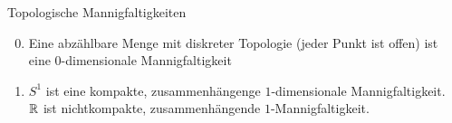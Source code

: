 \begin{example}{Topologische Mannigfaltigkeiten}
  \begin{enumerate}
    \setcounter{enumi}{-1}
    \item Eine abzählbare Menge mit diskreter Topologie (jeder Punkt ist offen) ist eine $ 0 $-dimensionale Mannigfaltigkeit 
    \item $ S^1 $ ist eine kompakte, zusammenhängenge $ 1 $-dimensionale Mannigfaltigkeit. \\
      $ \mathbb{R} $ ist nichtkompakte, zusammenhängende $ 1 $-Mannigfaltigkeit.
  \end{enumerate}
\end{example}
